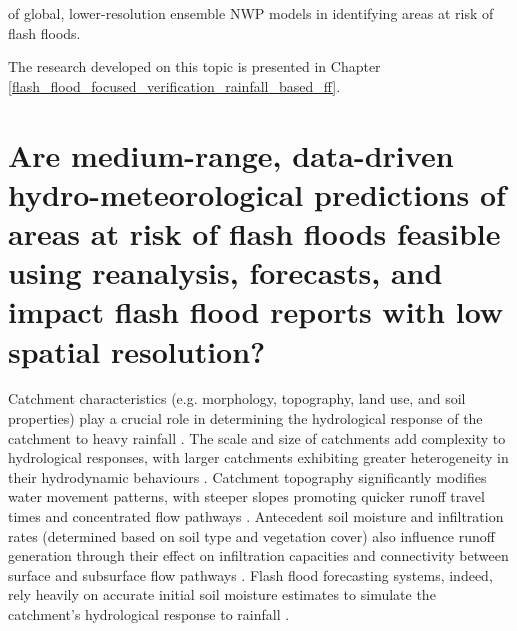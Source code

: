 of global, lower-resolution ensemble NWP models in identifying areas at risk of flash floods. 

The research developed on this topic is presented in Chapter \ref{flash_flood_focused_verification_rainfall_based_ff}. 


\section{Are medium-range, data-driven hydro-meteorological predictions of areas at risk of flash floods feasible using reanalysis, forecasts, and impact flash flood reports with low spatial resolution?}
\label{literature_review_regional_data_driven_models}

Catchment  characteristics (e.g. morphology, topography, land use, and soil properties) play a crucial role in determining the hydrological response of the catchment to heavy rainfall \citep{HenaoSalgado_2022, Duan_2022}. The scale and size of catchments add complexity to hydrological responses, with larger catchments exhibiting greater heterogeneity in their hydrodynamic behaviours \citep{Luong_2021}. Catchment topography significantly modifies water movement patterns, with steeper slopes promoting quicker runoff travel times and concentrated flow pathways \citep{Maqtan_2022}. Antecedent soil moisture and infiltration rates (determined based on soil type and vegetation cover) also influence runoff generation through their effect on infiltration capacities and connectivity between surface and subsurface flow pathways \citep{Zhai_2018}. Flash flood forecasting systems, indeed, rely heavily on accurate initial soil moisture estimates to simulate the catchment's hydrological response to rainfall \citep{Yatheendradas_2008}.

